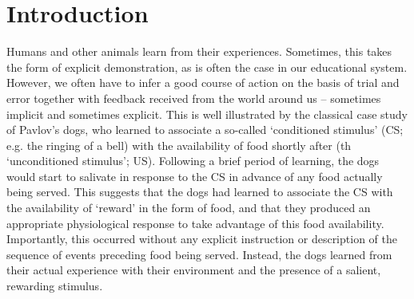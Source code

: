 \section{Introduction}
\label{sec:intro}

Humans and other animals learn from their experiences.
Sometimes, this takes the form of explicit demonstration, as is often the case in our educational system.
However, we often have to infer a good course of action on the basis of trial and error together with feedback received from the world around us -- sometimes implicit and sometimes explicit.
This is well illustrated by the classical case study of Pavlov's dogs, who learned to associate a so-called `conditioned stimulus' (CS; e.g. the ringing of a bell) with the availability of food shortly after (th `unconditioned stimulus'; US).
Following a brief period of learning, the dogs would start to salivate in response to the CS in advance of any food actually being served.
This suggests that the dogs had learned to associate the CS with the availability of `reward' in the form of food, and that they produced an appropriate physiological response to take advantage of this food availability.
Importantly, this occurred without any explicit instruction or description of the sequence of events preceding food being served.
Instead, the dogs learned from their actual experience with their environment and the presence of a salient, rewarding stimulus.

